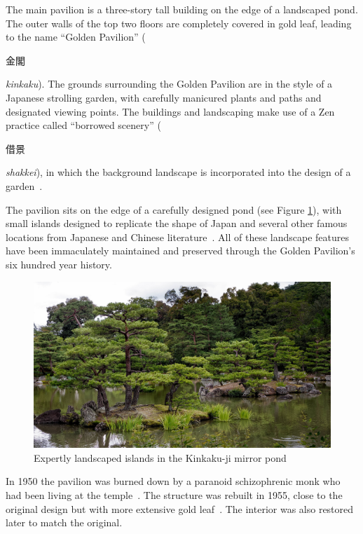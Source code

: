 \documentclass[a4paper, 10pt, american, titlepage]{article}
\begin{document}
The main pavilion is a three-story tall building on the edge of a landscaped
pond. The outer walls of the top two floors are completely covered in gold leaf,
leading to the name ``Golden Pavilion'' (\begin{CJK}{UTF8}{min}金閣\end{CJK}
\textit{kinkaku}). The grounds surrounding the Golden Pavilion are in the style
of a Japanese strolling garden, with carefully manicured plants and paths and
designated viewing points. The buildings and landscaping make use of a Zen
practice called ``borrowed scenery'' (\begin{CJK}{UTF8}{min}借景\end{CJK}
\textit{shakkei}), in which the background landscape is incorporated into the
design of a garden~\autocite{noboru2013}.

The pavilion sits on the edge of a carefully designed pond (see Figure
\ref{fig:kinkakujiGrounds}), with small islands designed to replicate the shape
of Japan and several other famous locations from Japanese and Chinese
literature~\autocite{young2007}. All of these landscape features have been
immaculately maintained and preserved through the Golden Pavilion's six hundred
year history.

\begin{figure}[h]
	\centering
	\includegraphics[width=\textwidth]{kinkakuji-grounds.jpg}
    \caption[Expertly landscaped islands in the Kinkaku-ji mirror pond]{Expertly
		landscaped islands in the Kinkaku-ji mirror pond~\autocite{desousa2014}}
	\label{fig:kinkakujiGrounds}
\end{figure}

In 1950 the pavilion was burned down by a paranoid schizophrenic monk who had
been living at the temple~\autocite{borowitz2005}. The structure was rebuilt in
1955, close to the original design but with more extensive gold
leaf~\autocite{bornoff2000}. The interior was also restored later to match the
original.
\end{document}
